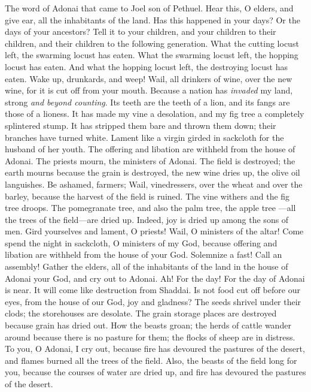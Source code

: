 
\begin{biblechapter} %
\verse The word of Adonai that came to Joel son of Pethuel.
 Hear this, O elders, 
and give ear, all the inhabitants of the land. 
Has this happened in your days? 
Or the days of your ancestors?
\verse Tell it to your children, 
and your children to their children, 
and their children to the following generation.
\verse What the cutting locust left, 
the swarming locust has eaten. 
What the swarming locust left, 
the hopping locust has eaten. 
And what the hopping locust left, 
the destroying locust has eaten.
\verse Wake up, drunkards, and weep! 
Wail, all drinkers of wine, over the new wine, 
for it is cut off from your mouth.
\verse Because a nation has \textit{invaded} my land, 
strong \textit{and beyond counting}. 
Its teeth are the teeth of a lion, 
and its fangs are those of a lioness.
\verse It has made my vine a desolation, 
and my fig tree a completely splintered stump. 
It has stripped them bare and thrown them down; 
their branches have turned white.
\verse Lament like a virgin girded in sackcloth 
for the husband of her youth.
\verse The offering and libation are withheld 
from the house of Adonai. 
The priests mourn, 
the ministers of Adonai.
\verse The field is destroyed; 
the earth mourns 
because the grain is destroyed, 
the new wine dries up, 
the olive oil languishes.
\verse Be ashamed, farmers; 
Wail, vinedressers, 
over the wheat and over the barley, 
because the harvest of the field is ruined.
\verse The vine withers 
and the fig tree droops. 
The pomegranate tree, and also the palm tree, the apple tree 
—all the trees of the field—are dried up. 
Indeed, joy is dried up 
among the sons of men.
\verse Gird yourselves and lament, O priests! 
Wail, O ministers of the altar! 
Come spend the night in sackcloth, 
O ministers of my God, 
because offering and libation 
are withheld from the house of your God.
\verse Solemnize a fast! 
Call an assembly! 
Gather the elders, 
all of the inhabitants of the land 
in the house of Adonai your God, 
and cry out to Adonai.
\verse Ah! For the day! 
For the day of Adonai is near. 
It will come like destruction from Shaddai.
\verse Is not food cut off 
before our eyes, 
from the house of our God, 
joy and gladness?
\verse The seeds shrivel under their clods; 
the storehouses are desolate. 
The grain storage places are destroyed 
because grain has dried out.
\verse How the beasts groan; 
the herds of cattle wander around 
because there is no pasture for them; 
the flocks of sheep are in distress.
\verse To you, O Adonai, I cry out, 
because fire has devoured 
the pastures of the desert, 
and flames burned 
all the trees of the field.
\verse Also, the beasts of the field 
long for you, 
because the courses of water 
are dried up, 
and fire has devoured 
the pastures of the desert.
\end{biblechapter}

